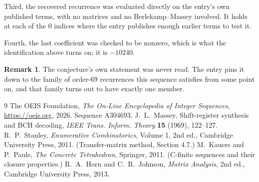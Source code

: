 \documentclass[11pt,a4paper]{article}
\theoremstyle{plain}
\theoremstyle{definition}
\newtheorem{remark}[theorem]{Remark}
\begin{document}
Third, the recovered recurrence was evaluated directly on the entry's own published terms, with
no matrices and no Berlekamp--Massey involved. It holds at each of the $0$ indices where
the entry publishes enough earlier terms to test it.

Fourth, the last coefficient was checked to be nonzero, which is what the identification above
turns on; it is $-10240$.

\begin{remark}
The conjecture's own statement was never read. The entry pins it down to the family of
order-$69$ recurrences this sequence satisfies from some point on, and that family turns
out to have exactly one member.
\end{remark}

\begin{thebibliography}{9}
 The OEIS Foundation, \emph{The On-Line Encyclopedia of Integer
Sequences}, \url{https://oeis.org}, 2026. Sequence A304693.
 J.~L.~Massey, Shift-register synthesis and BCH decoding, \emph{IEEE
Trans. Inform. Theory} \textbf{15} (1969), 122--127.
 R.~P.~Stanley, \emph{Enumerative Combinatorics}, Volume 1, 2nd ed.,
Cambridge University Press, 2011. (Transfer-matrix method, Section 4.7.)
 M.~Kauers and P.~Paule, \emph{The Concrete Tetrahedron}, Springer, 2011.
(C-finite sequences and their closure properties.)
 R.~A.~Horn and C.~R.~Johnson, \emph{Matrix Analysis}, 2nd ed., Cambridge
University Press, 2013.
\end{thebibliography}
\end{document}
